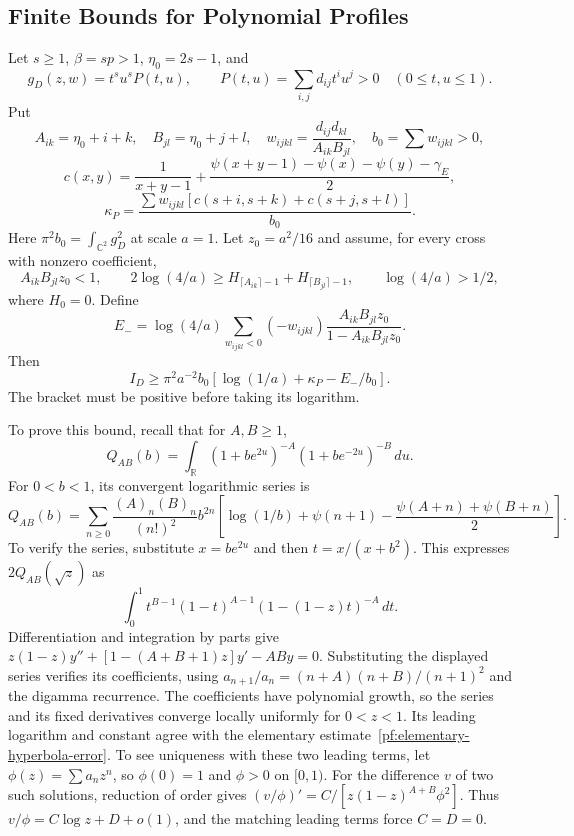 \subsection{Finite Bounds for Polynomial Profiles}

Let $s\ge1$, $\beta=sp>1$, $\eta_0=2s-1$, and
\[
 g_D(z,w)=t^s u^s P(t,u),\qquad
 P(t,u)=\sum_{i,j}d_{ij}t^iu^j>0\quad(0\le t,u\le1).
\]
Put
\[
 A_{ik}=\eta_0+i+k,\quad B_{jl}=\eta_0+j+l,\quad
 w_{ijkl}=\frac{d_{ij}d_{kl}}{A_{ik}B_{jl}},\quad b_0=\sum w_{ijkl}>0,
\]
\[
 c(x,y)=\frac1{x+y-1}
 +\frac{\psi(x+y-1)-\psi(x)-\psi(y)-\gamma_E}{2},
\]
\[
 \kappa_P=\frac{\sum w_{ijkl}[c(s+i,s+k)+c(s+j,s+l)]}{b_0}.
\]
Here $\pi^2b_0=\int_{\mathbb C^2}g_D^2$ at scale $a=1$.
Let $z_0=a^2/16$ and assume, for every cross with nonzero coefficient,
\begin{equation}\label{pf:cross-threshold}
 A_{ik}B_{jl}z_0<1,\qquad
 2\log(4/a)\ge H_{\lceil A_{ik}\rceil-1}+H_{\lceil B_{jl}\rceil-1},
 \qquad \log(4/a)>1/2,
\end{equation}
where $H_0=0$. Define
\[
 E_- =\log(4/a)\sum_{w_{ijkl}<0}(-w_{ijkl})
                \frac{A_{ik}B_{jl}z_0}{1-A_{ik}B_{jl}z_0}.
\]
Then
\begin{equation}\label{pf:polynomial-overlap}
 I_D\ge\pi^2a^{-2}b_0
       [\log(1/a)+\kappa_P-E_-/b_0].
\end{equation}
The bracket must be positive before taking its logarithm.

To prove this bound, recall that for $A,B\ge1$,
\[
 Q_{AB}(b)=\int_{\mathbb R}(1+be^{2u})^{-A}(1+be^{-2u})^{-B}\,du.
\]
For $0<b<1$, its convergent logarithmic series is
\[
 Q_{AB}(b)=\sum_{n\ge0}\frac{(A)_n(B)_n}{(n!)^2}b^{2n}
 \left[\log(1/b)+\psi(n+1)-\frac{\psi(A+n)+\psi(B+n)}2\right].
\]
To verify the series, substitute $x=be^{2u}$ and then $t=x/(x+b^2)$.
This expresses $2Q_{AB}(\sqrt z)$ as
\[
 \int_0^1t^{B-1}(1-t)^{A-1}(1-(1-z)t)^{-A}\,dt.
\]
Differentiation and integration by parts give
$z(1-z)y''+[1-(A+B+1)z]y'-AB y=0$.
Substituting the displayed series verifies its coefficients, using
$a_{n+1}/a_n=(n+A)(n+B)/(n+1)^2$ and the digamma recurrence.
The coefficients have polynomial growth, so the series and its fixed
derivatives converge locally uniformly for $0<z<1$. Its leading
logarithm and constant agree with the elementary estimate~\eqref{pf:elementary-hyperbola-error}. To see uniqueness with these two leading terms, let
$\phi(z)=\sum a_nz^n$, so $\phi(0)=1$ and $\phi>0$ on $[0,1)$.
For the difference $v$ of two such solutions, reduction of order gives
$(v/\phi)'=C/[z(1-z)^{A+B}\phi^2]$. Thus
$v/\phi=C\log z+D+o(1)$, and the matching leading terms force $C=D=0$.

